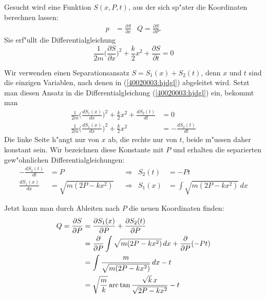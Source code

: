 \begin{loesung}
\begin{teilaufgaben}
\item Gesucht wird eine Funktion $S(x,P,t)$, aus der sich sp"ater die
Koordinaten berechnen lassen:
\begin{align*}
p&=\frac{\partial S}{\partial x} & Q=\frac{\partial S}{\partial P}.
\end{align*}
Sie erf"ullt die Differentialgleichung
\begin{equation}
\frac1{2m}\biggl(\frac{\partial S}{\partial x}\biggr)^2+\frac{k}2x^2
+\frac{\partial S}{\partial t}=0
\label{40020003:hjdgl}
\end{equation}
\item
Wir verwenden einen Separationsansatz $S=S_1(x)+S_2(t)$, denn $x$ und $t$
sind die einzigen Variablen, nach denen in (\ref{40020003:hjdgl})
abgeleitet wird.
Setzt man diesen Ansatz in die Differentialgleichung (\ref{40020003:hjdgl}) ein, bekommt man
\begin{align*}
\frac1{2m}\biggl(\frac{dS_1(x)}{dx}\biggr)^2+\frac{k}2x^2+\frac{dS_2(t)}{dt}&=0
\\
\frac1{2m}\biggl(\frac{dS_1(x)}{dx}\biggr)^2+\frac{k}2x^2&=-\frac{dS_2(t)}{dt}
\end{align*}
Die linke Seite h"angt nur von $x$ ab, die rechte nur von $t$, beide m"ussen
daher konstant sein. Wir bezeichnen diese Konstante mit $P$ und erhalten
die separierten gew"ohnlichen Differentialgleichungen:
\begin{align*}
-\frac{dS_2(t)}{dt}&=P&
&\Rightarrow&
S_2(t)&=-Pt\\
\frac{dS_1(x)}{dx}&=\sqrt{m(2P-kx^2)}&
&\Rightarrow&
S_1(x)&=\int\sqrt{m(2P-kx^2)}\,dx
\end{align*}
\item
Jetzt kann man durch Ableiten nach $P$ die neuen Koordinaten finden:
\begin{align*}
Q=\frac{\partial S}{\partial P}
&=\frac{\partial S_1(x)}{\partial P}+\frac{\partial S_2(t)}{\partial P}
\notag
\\
&=\frac{\partial}{\partial P}\int\sqrt{m(2P-kx^2)}\,dx+\frac{\partial}{\partial P}(-Pt)
\notag
\\
&=\int \frac{m}{\sqrt{m(2P-kx^2)}} \,dx-t
\label{40020003:integral}
\\
&=\sqrt{\frac{m}{k}}\operatorname{arc}\tan\frac{\sqrt{k}\,x}{\sqrt{2P-kx^2}} -t

\end{align*}
\end{teilaufgaben}
\end{loesung}
